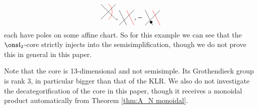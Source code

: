 \documentclass[11pt,reqno]{amsart}
\begin{document}
\begin{example}
\[{{\begin{tikzpicture}[scale=0.375]
    \draw[red] (2,0) to[in=-30,out=30] (2,2);
    \draw (1,0)--(3,2);
    \draw (3,0)--(1,2);
\end{tikzpicture}}},
{\hackcenter{\begin{tikzpicture}[scale=0.375]
    \draw (1,2)--(2,0);
    \draw[red] (2,2)--(3,0);
    \draw (3,2)--(1,0);
\end{tikzpicture}}},
{-\ \hackcenter{\begin{tikzpicture}[scale=0.375]
    \draw (1,2)--(2,0);
    \draw[red] (2,2)--(3,0);
    \draw (3,2)--(1,0);
    \fill (1.8,0.4) circle (5pt);
\end{tikzpicture}}}\] 
each have poles on some affine chart. So for this example we can see that the $\sl_2$-core strictly injects into the semisimplification, though we do not prove this in general in this paper.

Note that the core is 13-dimensional and not semisimple. Its Grothendieck group is rank 3, in particular bigger than that of the KLR. We also do not investigate the decategorification of the core in this paper, though it receives a monoidal product automatically from Theorem \ref{thm:A_N monoidal}. 
\end{example}
\end{document}
